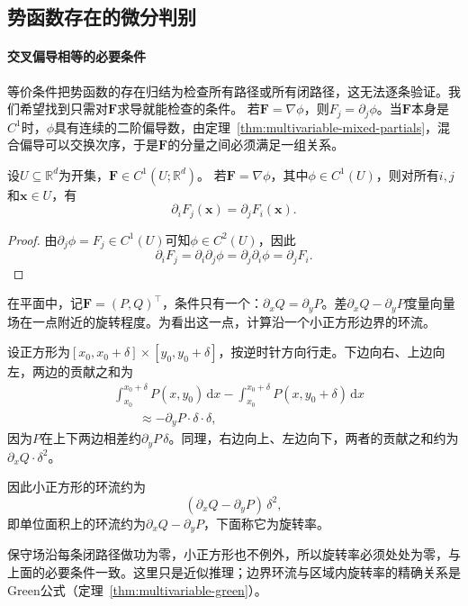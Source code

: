 \subsection{势函数存在的微分判别}

\paragraph{交叉偏导相等的必要条件}

等价条件把势函数的存在归结为检查所有路径或所有闭路径，这无法逐条验证。我们希望找到只需对$\bm F$求导就能检查的条件。
若$\bm F=\nabla\phi$，则$F_j=\partial_j\phi$。当$\bm F$本身是$C^1$时，$\phi$具有连续的二阶偏导数，由定理~\ref{thm:multivariable-mixed-partials}，混合偏导可以交换次序，于是$\bm F$的分量之间必须满足一组关系。
\begin{theorem}[保守场的必要条件]
设$U\subseteq\mathbb R^d$为开集，$\bm F\in C^1(U;\mathbb R^d)$。
若$\bm F=\nabla\phi$，其中$\phi\in C^1(U)$，则对所有$i,j$和$\bm x\in U$，有
\[
 \partial_iF_j(\bm x)=\partial_jF_i(\bm x).
\]
\end{theorem}
\begin{proof}
由$\partial_j\phi=F_j\in C^1(U)$可知$\phi\in C^2(U)$，因此
\[
 \partial_iF_j=\partial_i\partial_j\phi=\partial_j\partial_i\phi=\partial_jF_i .
\]
\end{proof}

在平面中，记$\bm F=(P,Q)^\top$，条件只有一个：$\partial_xQ=\partial_yP$。差$\partial_xQ-\partial_yP$度量向量场在一点附近的旋转程度。为看出这一点，计算沿一个小正方形边界的环流。

设正方形为$[x_0,x_0+\delta]\times[y_0,y_0+\delta]$，按逆时针方向行走。下边向右、上边向左，两边的贡献之和为
\[
 \begin{aligned}
 &\int_{x_0}^{x_0+\delta}P(x,y_0)\,\mathrm dx-\int_{x_0}^{x_0+\delta}P(x,y_0+\delta)\,\mathrm dx\\
 &\qquad\approx-\partial_yP\cdot\delta\cdot\delta ,
 \end{aligned}
\]
因为$P$在上下两边相差约$\partial_yP\,\delta$。同理，右边向上、左边向下，两者的贡献之和约为$\partial_xQ\cdot\delta^2$。

因此小正方形的环流约为
\[
 (\partial_xQ-\partial_yP)\,\delta^2 ,
\]
即单位面积上的环流约为$\partial_xQ-\partial_yP$，下面称它为旋转率。

保守场沿每条闭路径做功为零，小正方形也不例外，所以旋转率必须处处为零，与上面的必要条件一致。这里只是近似推理；边界环流与区域内旋转率的精确关系是Green公式（定理~\ref{thm:multivariable-green}）。

